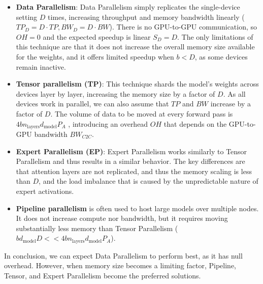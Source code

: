 \begin{itemize}
    \item \textbf{Data Parallelism}: Data Parallelism simply replicates the single-device setting $D$ times, increasing throughput and memory bandwidth linearly ($TP_D=D\cdot TP, BW_D=D\cdot BW$). There is no GPU-to-GPU communication, so $OH=0$ and the expected speedup is linear $S_D = D$. The only limitations of this technique are that it does not increase the overall memory size available for the weights, and it offers limited speedup when $b < D$, as some devices remain inactive.

    \item \textbf{Tensor parallelism (TP)}: This technique shards the model's weights across devices layer by layer, increasing the memory size by a factor of $D$. As all devices work in parallel, we can also assume that $TP$ and $BW$ increase by a factor of $D$. The volume of data to be moved at every forward pass is $4b n_{\text{layers}}d_{\text{model}} P_A$  \cite{subramanian2024comprehensive}, introducing an overhead $OH$ that depends on the GPU-to-GPU bandwidth $BW_{C2C}$.

    \item \textbf{Expert Parallelism (EP)}: Expert Parallelism works similarly to Tensor Parallelism and thus results in a similar behavior. The key differences are that attention layers are not replicated, and thus the memory scaling is less than $D$, and the load imbalance that is caused by the unpredictable nature of expert activations.

    \item \textbf{Pipeline parallelism} is often used to host large models over multiple nodes. It does not increase compute nor bandwidth, but it requires moving substantially less memory than Tensor Parallelism ($b d_{\text{model}}D << 4b n_{\text{layers}}d_{\text{model}} P_A$).
\end{itemize}

In conclusion, we can expect Data Parallelism to perform best, as it has null overhead. However, when memory size becomes a limiting factor, Pipeline, Tensor, and Expert Parallelism become the preferred solutions.